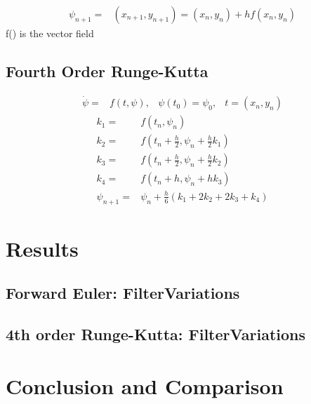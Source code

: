 \documentclass[11pt,a4paper,english]{article}
\numberwithin{equation}{section}
\begin{document}
\begin{align*}
	\psi_{n+1} =& (x_{n+1}, y_{n+1}) = (x_n, y_n) + hf(x_n, y_n)
\end{align*}
f() is the vector field

\subsection{Fourth Order Runge-Kutta}
\begin{align*}
	\dot{\psi} =& f(t,\psi), & \psi(t_0) = \psi_0, & t = (x_n, y_n)
\end{align*}
\begin{align*}
	k_1 =& f(t_n, \psi_n)	\\
	k_2 =& f(t_n + \frac{h}{2}, \psi_n + \frac{h}{2}k_1)	\\
	k_3 =& f(t_n + \frac{h}{2}, \psi_n + \frac{h}{2}k_2)	\\
	k_4 =& f(t_n + h, \psi_n + hk_3)	\\	
	\psi_{n+1} =& \psi_n + \frac{h}{6}(k_1 + 2k_2 + 2k_3 + k_4)
\end{align*}

\section{Results}
\subsection{Forward Euler: FilterVariations}


\subsection{4th order Runge-Kutta: FilterVariations}


\section{Conclusion and Comparison}
\end{document}
